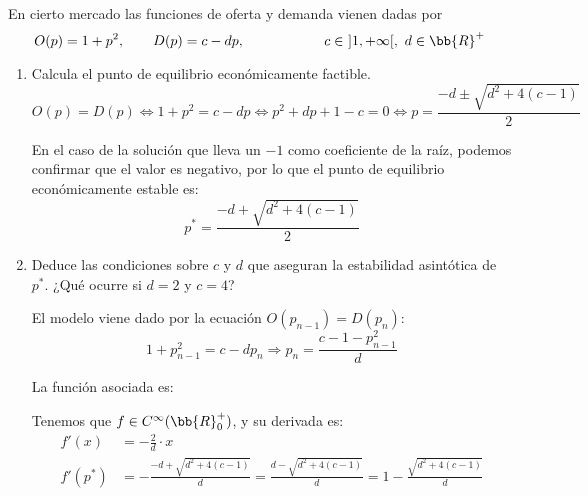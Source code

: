\begin{ejercicio}\label{ej:2.13}
    En cierto mercado las funciones de oferta y demanda vienen dadas por
    \begin{equation*}
        O(p)=1+p^2,\qquad D(p)=c-dp,\hspace{2cm}c\in~]1,+\infty[,~d\in \bb{R}^+
    \end{equation*}
    \begin{enumerate}
        \item Calcula el punto de equilibrio económicamente factible.
        \begin{equation*}
            O(p) = D(p) \Longleftrightarrow
            1+p^2 = c-dp \Longleftrightarrow
            p^2+dp +1-c = 0\Longleftrightarrow
            p = \frac{-d\pm \sqrt{d^2+4(c-1)}}{2}
        \end{equation*}

        En el caso de la solución que lleva un $-1$ como coeficiente de la raíz, podemos confirmar que el valor es negativo, por lo que el punto de equilibrio económicamente estable es:
        \begin{equation*}
            p^\ast = \frac{-d + \sqrt{d^2+4(c-1)}}{2}
        \end{equation*}
        
        \item Deduce las condiciones sobre $c$ y $d$ que aseguran la estabilidad asintótica de $p^\ast$. ¿Qué ocurre si $d = 2$ y $c = 4$?

        El modelo viene dado por la ecuación $O(p_{n-1})= D(p_n)$:
        \begin{equation*}
            1+p_{n-1}^2 = c-dp_n \Longrightarrow
            p_n = \frac{c-1-p_{n-1}^2}{d}
        \end{equation*}

        La función asociada es:

        Tenemos que $f\in C^\infty(\bb{R}^+_0)$, y su derivada es:
        \begin{align*}
            f'(x) &= -\frac{2}{d}\cdot x\\
            f'(p^\ast) &= -\frac{-d + \sqrt{d^2+4(c-1)}}{d} = \frac{d - \sqrt{d^2+4(c-1)}}{d}
            = 1-\frac{\sqrt{d^2+4(c-1)}}{d}
        \end{align*}


\end{enumerate}
\end{ejercicio}
